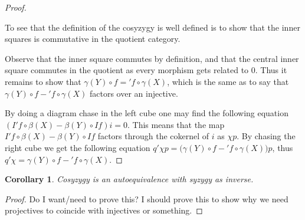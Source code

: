 \documentclass[12pt]{article}
\newtheorem{corollary}{Corollary}[theorem]
\theoremstyle{definition}
\theoremstyle{remark}
\begin{document}
\begin{proof}
\begin{center}
                \end{center}
                To see that the definition of the cosyzygy is well defined is to show that the inner squares is commutative in the quotient category.
                
                Observe that the inner square commutes by definition, and that the central inner square commutes in the quotient as every morphism gets related to $0$. Thus it remains to show that \underline{$\gamma (Y)\circ$$f$}$=$\underline{$'f\circ\gamma (X)$}, which is the same as to say that $\gamma (Y)\circ$$f-$$'f\circ\gamma (X)$ factors over an injective.

                By doing a diagram chase in the left cube one may find the following equation $(I'f\circ \beta(X)-\beta (Y)\circ If)i=0$. This means that the map $I'f\circ \beta(X)-\beta (Y)\circ If$ factors through the cokernel of $i$ as $\chi p$. By chasing the right cube we get the following equation $q'\chi p = (\gamma (Y)\circ$$f-$$'f\circ\gamma (X))p$, thus $q'\chi =$$\gamma (Y)\circ$$f-$$'f\circ\gamma (X)$.
            \end{proof}

            \begin{corollary}
                Cosyzygy is an autoequivalence with syzygy as inverse.
            \end{corollary}

            \begin{proof}
                Do I want/need to prove this? I should prove this to show why we need projectives to coincide with injectives or something.
            \end{proof}
\end{document}

